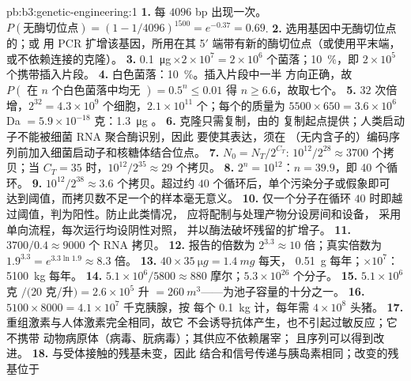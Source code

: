 \begin{solution}{pb:b3:genetic-engineering:1}
\textbf{1.} 每 $4096$ bp 出现一次。$P(\text{无酶切位点}) = (1 - 1/4096)^{1500}
= e^{-0.37} = 0.69$.
\textbf{2.} 选用基因中无酶切位点的；或
用 PCR 扩增该基因，所用在其 5$'$
端带有新的酶切位点（或使用平末端，或不依赖连接的克隆）。
\textbf{3.} \qty{0.1}{\micro g}\,$\times 2\times 10^{7} = 2\times
10^{6}$ 个菌落；\qty{10}{\%}，即 $2\times 10^{5}$ 个携带插入片段。
\textbf{4.} 白色菌落：\qty{10}{\%}。插入片段中一半
方向正确，故 $P(\text{ 在 } n \text{ 个白色菌落中均无 }) = 0.5^{n} \le 0.01$
得 $n \ge 6.6$，故取七个。
\textbf{5.} $32$ 次倍增，$2^{32} = 4.3\times 10^{9}$ 个细胞，$2.1\times
10^{11}$ 个；每个的质量为 $5500\times 650 = 3.6\times 10^{6}$ Da $=
5.9\times 10^{-18}$ 克：\qty{1.3}{\micro g} 。
\textbf{6.} 克隆只需复制，由的
复制起点提供；人类启动子不能被细菌 RNA 聚合酶识别，因此
要使其表达，须在
（无内含子的）编码序列前加入细菌启动子和核糖体结合位点。
\textbf{7.} $N_{0} = N_{T}/2^{C_{T}}$: $10^{12}/2^{28} \approx 3700$
个拷贝；当 $C_{T} = 35$ 时，$10^{12}/2^{35} \approx 29$ 个拷贝。
\textbf{8.} $2^{n} = 10^{12}$：$n = 39.9$，即 40 个循环。
\textbf{9.} $10^{12}/2^{38} \approx 3.6$ 个拷贝。超过约 $40$
个循环后，单个污染分子或假象即可
达到阈值，而拷贝数不足一个的样本毫无意义。
\textbf{10.} 仅一个分子在循环 $40$ 时即越过阈值，判为阳性。防止此类情况，
应将配制与处理产物分设房间和设备，
采用单向流程，每次运行均设阴性对照，
并以酶法破坏残留的扩增子。
\textbf{11.} $3700/0.4 \approx 9000$ 个 RNA 拷贝。
\textbf{12.} 报告的倍数为 $2^{3.3} \approx 10$ 倍；真实倍数为 $1.9^{3.3} =
e^{3.3\ln 1.9} \approx 8.3$ 倍。
\textbf{13.} $40\times \qty{35}{\micro g} = \qty{1.4}{mg}$ 每天，
\qty{0.51}{g} 每年；$\times 10^{7}$：\qty{5100}{kg} 每年。
\textbf{14.} $5.1\times 10^{6}/5800 \approx 880$ 摩尔；$5.3\times 10^{26}$
个分子。
\textbf{15.} $5.1\times 10^{6}$ 克 $/ (20$ 克/升$) = 2.6\times 10^{5}$ 升
$= \qty{260}{m^3}$——为池子容量的十分之一。
\textbf{16.} $5100\times 8000 = 4.1\times 10^{7}$ 千克胰腺，按
每个 \qty{0.1}{kg} 计，每年需 $4\times 10^{8}$ 头猪。
\textbf{17.} 重组激素与人体激素完全相同，故它
不会诱导抗体产生，也不引起过敏反应；它不携带
动物病原体（病毒、朊病毒）；其供应不依赖屠宰；
且序列可以得到改进。
\textbf{18.} 与受体接触的残基未变，因此
结合和信号传递与胰岛素相同；改变的残基位于

\end{solution}
